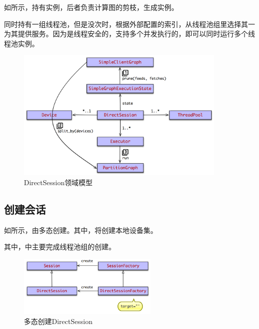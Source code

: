 \begin{content}
如所示，持有实例，后者负责计算图的剪枝，生成实例。

同时持有一组线程池，但是没次时，根据外部配置的索引，从线程池组里选择其一为其提供服务。因为是线程安全的，支持多个并发执行的，即可以同时运行多个线程池实例。

\begin{figure}[H]
\centering
\includegraphics[width=0.9\textwidth]{figures/local-direct-session-model.png}
\caption{DirectSession领域模型}
 \label{fig:local-direct-session-model}
\end{figure}

\subsection{创建会话}

如所示，由多态创建。其中，将创建本地设备集。

其中，中主要完成线程池组的创建。

\begin{figure}[H]
\centering
\includegraphics[width=0.6\textwidth]{figures/local-direct-session-factory.png}
\caption{多态创建DirectSession}
 \label{fig:local-direct-session-factory}
\end{figure}


\end{content}
